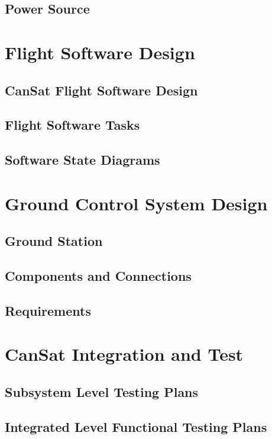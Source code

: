 \subsection{Power Source}

\newpage

\section{Flight Software Design}
\subsection{CanSat Flight Software Design}
\subsection{Flight Software Tasks}
\subsection{Software State Diagrams}

\newpage

\section{Ground Control System Design}
\subsection{Ground Station}
\subsection{Components and Connections}
\subsection{Requirements}

\newpage

\section{CanSat Integration and Test}
\subsection{Subsystem Level Testing Plans}
\subsection{Integrated Level Functional Testing Plans}
